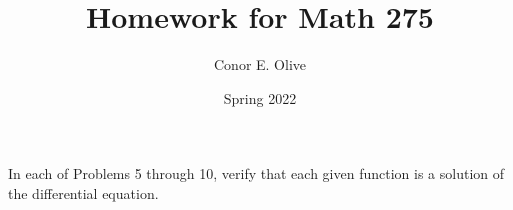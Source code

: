 \documentclass{lapchomework}
\title{Homework for Math 275}
\date{Spring 2022}
\author{Conor E. Olive}
\begin{document}

\tableofcontents
\pagebreak


\begin{instructions}
In each of Problems 5 through 10, verify that each given function is a
solution of the differential equation.
\end{instructions}
\end{document}
